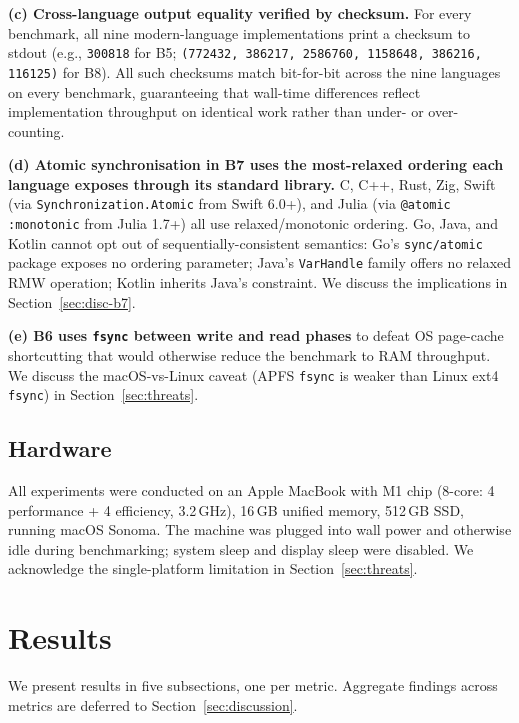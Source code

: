 \documentclass[10pt,conference]{IEEEtran}
\begin{document}
\textbf{(c) Cross-language output equality verified by checksum.}
For every benchmark, all nine modern-language implementations
print a checksum to stdout (e.g., \texttt{300818} for B5;
\texttt{(772432, 386217, 2586760, 1158648, 386216, 116125)} for
B8). All such checksums match bit-for-bit across the nine
languages on every benchmark, guaranteeing that wall-time
differences reflect implementation throughput on identical work
rather than under- or over-counting.

\textbf{(d) Atomic synchronisation in B7 uses the most-relaxed
ordering each language exposes through its standard library.} C,
C++, Rust, Zig, Swift (via \texttt{Synchronization.Atomic} from
Swift 6.0+), and Julia (via \texttt{@atomic :monotonic} from
Julia 1.7+) all use relaxed/monotonic ordering. Go, Java, and
Kotlin cannot opt out of sequentially-consistent semantics: Go's
\texttt{sync/atomic} package exposes no ordering parameter; Java's
\texttt{VarHandle} family offers no relaxed RMW operation; Kotlin
inherits Java's constraint. We discuss the implications in
Section~\ref{sec:disc-b7}.

\textbf{(e) B6 uses \texttt{fsync} between write and read phases}
to defeat OS page-cache shortcutting that would otherwise reduce
the benchmark to RAM throughput. We discuss the macOS-vs-Linux
caveat (APFS \texttt{fsync} is weaker than Linux ext4
\texttt{fsync}) in Section~\ref{sec:threats}.


\subsection{Hardware}

All experiments were conducted on an Apple MacBook with M1 chip
(8-core: 4 performance + 4 efficiency, 3.2\,GHz), 16\,GB unified
memory, 512\,GB SSD, running macOS Sonoma. The machine was plugged
into wall power and otherwise idle during benchmarking; system
sleep and display sleep were disabled. We acknowledge the
single-platform limitation in Section~\ref{sec:threats}.

\section{Results}
\label{sec:results}

We present results in five subsections, one per metric. Aggregate
findings across metrics are deferred to
Section~\ref{sec:discussion}.
\end{document}
